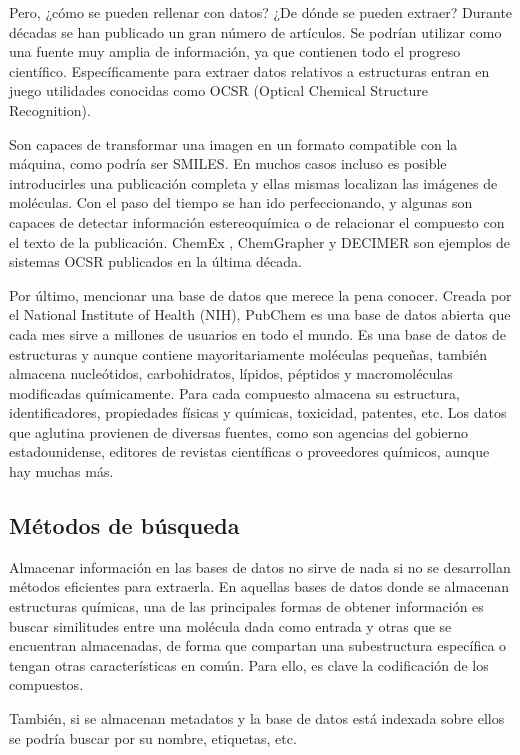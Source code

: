 Pero, ¿cómo se pueden rellenar con datos? ¿De dónde se pueden extraer? Durante décadas se han publicado un gran número de artículos. Se podrían utilizar como una fuente muy amplia de información, ya que contienen todo el progreso científico. Específicamente para extraer datos relativos a estructuras entran en juego utilidades conocidas como OCSR (Optical Chemical Structure Recognition).

Son capaces de transformar una imagen en un formato compatible con la máquina, como podría ser SMILES. En muchos casos incluso es posible introducirles una publicación completa y ellas mismas localizan las imágenes de moléculas. Con el paso del tiempo se han ido perfeccionando, y algunas son capaces de detectar información estereoquímica o de relacionar el compuesto con el texto de la publicación. ChemEx \cite{tharatipyakul2012chemex}, ChemGrapher \cite{oldenhof2020chemgrapher} y DECIMER \cite{rajan2020decimer} son ejemplos de sistemas OCSR publicados en la última década.

Por último, mencionar una base de datos que merece la pena conocer. Creada por el National Institute of Health (NIH), PubChem es una base de datos abierta que cada mes sirve a millones de usuarios en todo el mundo. Es una base de datos de estructuras y aunque contiene mayoritariamente moléculas pequeñas, también almacena nucleótidos, carbohidratos, lípidos, péptidos y macromoléculas modificadas químicamente. Para cada compuesto almacena su estructura, identificadores, propiedades físicas y químicas, toxicidad, patentes, etc. Los datos que aglutina provienen de diversas fuentes, como son agencias del gobierno estadounidense, editores de revistas científicas o proveedores químicos, aunque hay muchas más. \cite{pubchem}

\subsection{Métodos de búsqueda}
Almacenar información en las bases de datos no sirve de nada si no se desarrollan métodos eficientes para extraerla. En aquellas bases de datos donde se almacenan estructuras químicas, una de las principales formas de obtener información es buscar similitudes entre una molécula dada como entrada y otras que se encuentran almacenadas, de forma que compartan una subestructura específica o tengan otras características en común. Para ello, es clave la codificación de los compuestos.

También, si se almacenan metadatos y la base de datos está indexada sobre ellos se podría buscar por su nombre, etiquetas, etc. \cite{doi:10.1021/ci600234z}

